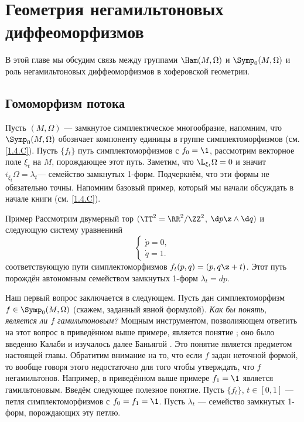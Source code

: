 \chapter[Негамильтоновы диффеоморфизмы]{Геометрия негамильтоновых диффеоморфизмов}\label{chap:14}

В этой главе мы обсудим связь между группами $\Ham(M,\Omega)$ и $\Symp_0(M,\Omega)$ и роль негамильтоновых диффеоморфизмов в хоферовской геометрии.

\section{Гомоморфизм потока}\label{sec:14.1}

Пусть $(M,\Omega)$ --- замкнутое симплектическое многообразие, напомним, что $\Symp_0(M,\Omega)$ обознчает компоненту единицы в группе симплектоморфизмов (см. \ref{1.4.C}).
Пусть $\{f_t\}$  путь симплектоморфизмов с $f_0 = \1$,
рассмотрим векторное поле $\xi_t$ на $M$, порождающее этот путь.
Заметим, что $\L_{\xi_t}\Omega=0$ и значит  $i_{\xi_t}\Omega=\lambda_t$ ​​--- семейство замкнутых 1-форм.
Подчеркнём, что эти формы не обязательно точны.
Напомним базовый пример, который мы начали обсуждать в начале книги (см. \ref{1.4.C}).


\begin{thm}{Пример}\label{14.1.A}
Рассмотрим двумерный тор $(\TT^2=\RR^2/\ZZ^2$, $\d p\z\wedge \d q)$ и следующую систему уравненинй
\[
\begin{cases}
\dot p=0,
\\
\dot q=1.
\end{cases}
\]
соответствующую пути симплектоморфизмов $f_t(p, q) = (p, q \z+ t)$.
Этот путь порождён автономным семейством замкнутых 1-форм $\lambda_t = dp$.
\end{thm}


Наш первый вопрос заключается в следующем.
Пусть дан симплектоморфизм $f\in\Symp_0(M,\Omega)$ (скажем, заданный явной формулой).
\textit{Как бы понять, является ли $f$ гамильтоновым?}
Мощным инструментом, позволияющем ответить на этот вопрос в приведённом выше примере, является понятие ; оно было введенно Калаби и изучалось далее Баньягой \cite{B1}.
Это понятие является предметом настоящей главы.
Обратитим внимание на то, что если $f$ задан неточной формой, то вообще говоря этого недостаточно для того чтобы утверждать, что $f$ негамильтонов.
Например, в приведённом выше примере $f_1 = \1$ является гамильтоновым.
Введём следующее полезное понятие.
Пусть $\{f_t\}$, $t\in[0,1]$ --- петля симплектоморфизмов с $f_0 = f_1 = \1$.
Пусть ${\lambda_t}$ --- семейство замкнутых 1-форм, порождающих эту петлю.

